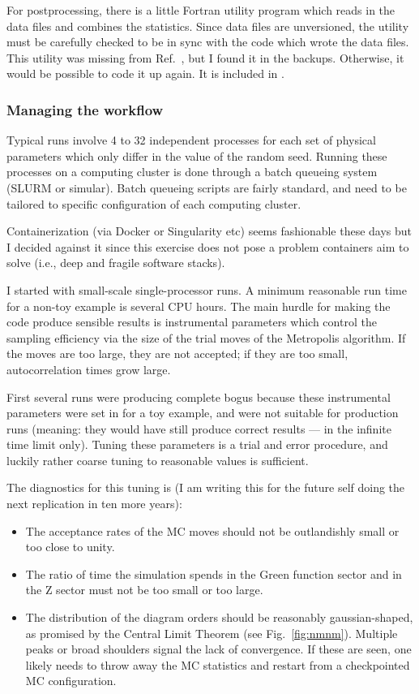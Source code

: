 For postprocessing, there is a little Fortran utility program which reads in
the data files and combines the statistics. Since data files are unversioned,
the utility must be carefully checked to be in sync with the code which wrote
the data files. 
This utility was missing from Ref.\ \cite{MCWA}, but I found it in the backups.
Otherwise, it would be possible to code it up again.  
It is included in \cite{GH:2020}.


\subsubsection{Managing the workflow}

Typical runs involve 4 to 32 independent processes for each set of physical
parameters which only differ in the value of the random seed. Running these
processes on a computing cluster is done through a batch queueing system
(SLURM or simular). Batch queueing scripts are fairly standard, and need to be
tailored to specific configuration of each computing cluster.

Containerization (via Docker or Singularity etc) seems fashionable these days
but I decided against it since this exercise does not pose a problem containers
aim to solve (i.e., deep and fragile software stacks). 

I started with small-scale single-processor runs. A minimum reasonable run time
for a non-toy example is several CPU hours. The main hurdle for making the code
produce sensible results is instrumental parameters which control the sampling
efficiency via the size of the trial moves of the Metropolis
algorithm. If the moves are too large, they are not accepted; if they are too small,
autocorrelation times grow large. 

First several runs were producing complete bogus
because these instrumental parameters were set in \cite{MCWA} for a toy example,
and were not suitable for production runs (meaning: they would have still
produce correct results --- in the infinite time limit only). 
Tuning these parameters is a trial and error procedure, and luckily rather coarse
tuning to reasonable values is sufficient. 

The diagnostics for this tuning is (I am writing this for the future self doing
the next replication in ten more years):

\begin{itemize}
\item The acceptance rates of the MC moves should not be outlandishly small or
too close to unity.

\item The ratio of time the simulation spends in the Green function sector and
in the Z sector must not be too small or too large.

\item The distribution of the diagram orders should be reasonably gaussian-shaped,
as promised by the Central Limit Theorem (see Fig.\ \ref{fig:nmnm}).
Multiple peaks or broad shoulders signal the lack of convergence. If these are seen,
one likely needs to throw away the MC statistics and restart from a checkpointed
MC configuration.
\end{itemize}

